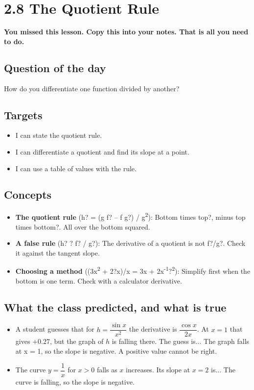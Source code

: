 \documentclass[11pt]{article}
\begin{document}
\section*{2.8 The Quotient Rule}
\textbf{You missed this lesson. Copy this into your notes. That is all you need to do.}\par\medskip
\subsection*{Question of the day}
How do you differentiate one function divided by another?\par
\subsection*{Targets}\begin{itemize}\item I can state the quotient rule.
\item I can differentiate a quotient and find its slope at a point.
\item I can use a table of values with the rule.\end{itemize}
\subsection*{Concepts}\begin{itemize}
\item \textbf{The quotient rule} (h? = (g f? -- f g?) / g\textsuperscript{2}): Bottom times top?, minus top times bottom?. All over the bottom squared.
\item \textbf{A false rule} (h? ? f? / g?): The derivative of a quotient is not f?/g?. Check it against the tangent slope.
\item \textbf{Choosing a method} ((3x\textsuperscript{2} + 2?x)/x = 3x + 2x\textsuperscript{-1}?\textsuperscript{2}): Simplify first when the bottom is one term. Check with a calculator derivative.
\end{itemize}
\subsection*{What the class predicted, and what is true}\begin{itemize}
\item A student guesses that for $h=\dfrac{\sin x}{x^{2}}$ the derivative is $\dfrac{\cos x}{2x}$. At $x=1$ that gives $+0.27$, but the graph of $h$ is falling there. The guess is...  The graph falls at x = 1, so the slope is negative. A positive value cannot be right.
\item The curve $y=\dfrac{1}{x}$ for $x>0$ falls as $x$ increases. Its slope at $x=2$ is...  The curve is falling, so the slope is negative.
\end{itemize}
\end{document}
